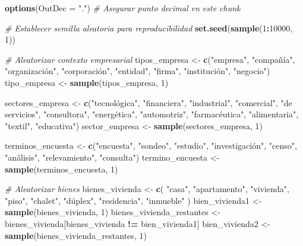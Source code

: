\documentclass[
]{article}
\author{}
\date{\vspace{-2.5em}}
\newenvironment{Shaded}{\begin{snugshade}}{\end{snugshade}}
\newcommand{\AttributeTok}[1]{\textcolor[rgb]{0.13,0.29,0.53}{#1}}
\newcommand{\CommentTok}[1]{\textcolor[rgb]{0.56,0.35,0.01}{\textit{#1}}}
\newcommand{\DecValTok}[1]{\textcolor[rgb]{0.00,0.00,0.81}{#1}}
\newcommand{\FunctionTok}[1]{\textcolor[rgb]{0.13,0.29,0.53}{\textbf{#1}}}
\newcommand{\NormalTok}[1]{#1}
\newcommand{\OtherTok}[1]{\textcolor[rgb]{0.56,0.35,0.01}{#1}}
\newcommand{\SpecialCharTok}[1]{\textcolor[rgb]{0.81,0.36,0.00}{\textbf{#1}}}
\newcommand{\StringTok}[1]{\textcolor[rgb]{0.31,0.60,0.02}{#1}}
\begin{document}
\begin{Shaded}
\begin{Highlighting}[]
\FunctionTok{options}\NormalTok{(}\AttributeTok{OutDec =} \StringTok{"."}\NormalTok{)  }\CommentTok{\# Asegurar punto decimal en este chunk}

\CommentTok{\# Establecer semilla aleatoria para reproducibilidad}
\FunctionTok{set.seed}\NormalTok{(}\FunctionTok{sample}\NormalTok{(}\DecValTok{1}\SpecialCharTok{:}\DecValTok{10000}\NormalTok{, }\DecValTok{1}\NormalTok{))}

\CommentTok{\# Aleatorizar contexto empresarial}
\NormalTok{tipos\_empresa }\OtherTok{\textless{}{-}} \FunctionTok{c}\NormalTok{(}\StringTok{"empresa"}\NormalTok{, }\StringTok{"compañía"}\NormalTok{, }\StringTok{"organización"}\NormalTok{, }\StringTok{"corporación"}\NormalTok{, }\StringTok{"entidad"}\NormalTok{, }\StringTok{"firma"}\NormalTok{, }\StringTok{"institución"}\NormalTok{, }\StringTok{"negocio"}\NormalTok{)}
\NormalTok{tipo\_empresa }\OtherTok{\textless{}{-}} \FunctionTok{sample}\NormalTok{(tipos\_empresa, }\DecValTok{1}\NormalTok{)}

\NormalTok{sectores\_empresa }\OtherTok{\textless{}{-}} \FunctionTok{c}\NormalTok{(}\StringTok{"tecnológica"}\NormalTok{, }\StringTok{"financiera"}\NormalTok{, }\StringTok{"industrial"}\NormalTok{, }\StringTok{"comercial"}\NormalTok{, }\StringTok{"de servicios"}\NormalTok{, }\StringTok{"consultora"}\NormalTok{, }\StringTok{"energética"}\NormalTok{,}
                     \StringTok{"automotriz"}\NormalTok{, }\StringTok{"farmacéutica"}\NormalTok{, }\StringTok{"alimentaria"}\NormalTok{, }\StringTok{"textil"}\NormalTok{, }\StringTok{"educativa"}\NormalTok{)}
\NormalTok{sector\_empresa }\OtherTok{\textless{}{-}} \FunctionTok{sample}\NormalTok{(sectores\_empresa, }\DecValTok{1}\NormalTok{)}

\NormalTok{terminos\_encuesta }\OtherTok{\textless{}{-}} \FunctionTok{c}\NormalTok{(}\StringTok{"encuesta"}\NormalTok{, }\StringTok{"sondeo"}\NormalTok{, }\StringTok{"estudio"}\NormalTok{, }\StringTok{"investigación"}\NormalTok{, }\StringTok{"censo"}\NormalTok{, }\StringTok{"análisis"}\NormalTok{, }\StringTok{"relevamiento"}\NormalTok{, }\StringTok{"consulta"}\NormalTok{)}
\NormalTok{termino\_encuesta }\OtherTok{\textless{}{-}} \FunctionTok{sample}\NormalTok{(terminos\_encuesta, }\DecValTok{1}\NormalTok{)}

\CommentTok{\# Aleatorizar bienes}
\NormalTok{bienes\_vivienda }\OtherTok{\textless{}{-}} \FunctionTok{c}\NormalTok{(}
  \StringTok{"casa"}\NormalTok{, }\StringTok{"apartamento"}\NormalTok{, }\StringTok{"vivienda"}\NormalTok{, }\StringTok{"piso"}\NormalTok{, }\StringTok{"chalet"}\NormalTok{, }\StringTok{"dúplex"}\NormalTok{, }\StringTok{"residencia"}\NormalTok{, }\StringTok{"inmueble"}
\NormalTok{)}
\NormalTok{bien\_vivienda1 }\OtherTok{\textless{}{-}} \FunctionTok{sample}\NormalTok{(bienes\_vivienda, }\DecValTok{1}\NormalTok{)}
\NormalTok{bienes\_vivienda\_restantes }\OtherTok{\textless{}{-}}\NormalTok{ bienes\_vivienda[bienes\_vivienda }\SpecialCharTok{!=}\NormalTok{ bien\_vivienda1]}
\NormalTok{bien\_vivienda2 }\OtherTok{\textless{}{-}} \FunctionTok{sample}\NormalTok{(bienes\_vivienda\_restantes, }\DecValTok{1}\NormalTok{)}


\end{Highlighting}
\end{Shaded}
\end{document}
